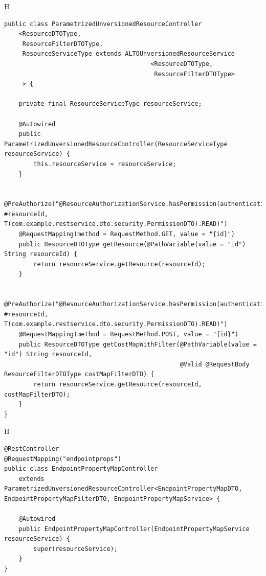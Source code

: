 \begin{center}
\begin{tabular}{H}
\begin{lstlisting}[frame=tlrb, caption=Parametrized Controller class for unversioned resources, label={lst:generic-unversioned-controller}, basicstyle=\tiny]
public class ParametrizedUnversionedResourceController
    <ResourceDTOType,
     ResourceFilterDTOType,
     ResourceServiceType extends ALTOUnversionedResourceService
                                        <ResourceDTOType,
                                         ResourceFilterDTOType>
     > {

    private final ResourceServiceType resourceService;

    @Autowired
    public ParametrizedUnversionedResourceController(ResourceServiceType resourceService) {
        this.resourceService = resourceService;
    }

    @PreAuthorize("@ResourceAuthorizationService.hasPermission(authentication, #resourceId, T(com.example.restservice.dto.security.PermissionDTO).READ)")
    @RequestMapping(method = RequestMethod.GET, value = "{id}")
    public ResourceDTOType getResource(@PathVariable(value = "id") String resourceId) {
        return resourceService.getResource(resourceId);
    }

    @PreAuthorize("@ResourceAuthorizationService.hasPermission(authentication, #resourceId, T(com.example.restservice.dto.security.PermissionDTO).READ)")
    @RequestMapping(method = RequestMethod.POST, value = "{id}")
    public ResourceDTOType getCostMapWithFilter(@PathVariable(value = "id") String resourceId,
                                                @Valid @RequestBody ResourceFilterDTOType costMapFilterDTO) {
        return resourceService.getResource(resourceId, costMapFilterDTO);
    }
}

\end{lstlisting}
\end{tabular}
\end{center}

\begin{center}
\begin{tabular}{H}
\begin{lstlisting}[frame=tlrb, caption=Concrete controller extending from a parametrized one, label={lst:endpoint-property-map-controller}, basicstyle=\tiny]
@RestController
@RequestMapping("endpointprops")
public class EndpointPropertyMapController
    extends ParametrizedUnversionedResourceController<EndpointPropertyMapDTO, EndpointPropertyMapFilterDTO, EndpointPropertyMapService> {

    @Autowired
    public EndpointPropertyMapController(EndpointPropertyMapService resourceService) {
        super(resourceService);
    }
}
\end{lstlisting}
\end{tabular}
\end{center}

